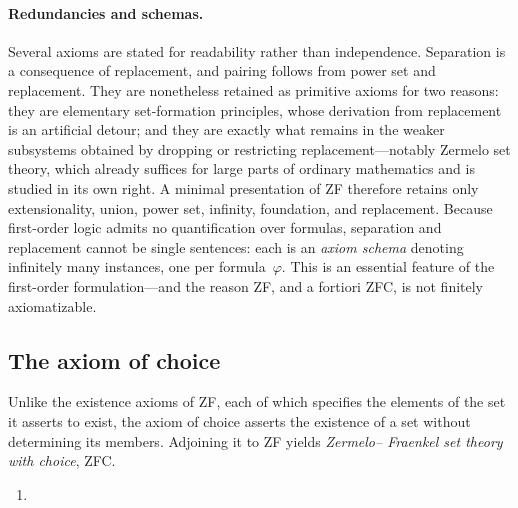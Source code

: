 \paragraph{Redundancies and schemas.}
Several axioms are stated for readability rather than independence. Separation is
a consequence of replacement, and pairing follows from power set and replacement.
They are nonetheless retained as primitive axioms for two reasons: they are
elementary set-formation principles, whose derivation from replacement is an
artificial detour; and they are exactly what remains in the weaker subsystems
obtained by dropping or restricting replacement---notably Zermelo set theory,
which already suffices for large parts of ordinary mathematics and is studied in
its own right. A minimal presentation of ZF therefore retains only
extensionality, union, power set, infinity, foundation, and replacement. Because
first-order logic admits no quantification over formulas, separation and
replacement cannot be single sentences: each is an \emph{axiom schema} denoting
infinitely many instances, one per formula~$\varphi$. This is an essential
feature of the first-order formulation---and the reason ZF, and a fortiori ZFC,
is not finitely axiomatizable.

\subsection{The axiom of choice}
\label{subsec:set-theory-choice}

Unlike the existence axioms of ZF, each of which specifies the elements of the
set it asserts to exist, the axiom of choice asserts the existence of a set
without determining its members. Adjoining it to ZF yields \emph{Zermelo--
Fraenkel set theory with choice}, ZFC.

\begin{enumerate}[label=\textbf{(A\arabic*)}, ref=A\arabic*, start=9, leftmargin=3.6em, labelsep=1em, itemsep=0.8ex]

  \item\label{ax:choice} 

\end{enumerate}

